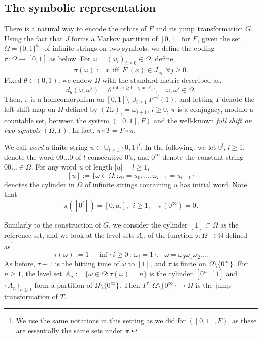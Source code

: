 \documentclass{amsart}
\theoremstyle{definition}
\theoremstyle{remark}
\theoremstyle{definition}
\numberwithin{equation}{section}
\newcommand{\N}{\mathbb N}
\begin{document}
\subsection{The symbolic representation} \label{sec:symb}
There is a natural way to encode the orbits of $F$ and its jump transformation $G$. Using the fact that $J$ forms a Markov partition of $[0,1]$ for $F$, given the set $\Omega = \{0,1\}^{\N_{0}}$ of infinite strings on two symbols, we define the coding $\pi : \Omega \to [0,1]$ as below. For $\omega = (\omega_{i})_{i \ge 0} \in \Omega$, define,
    \[
        \pi(\omega) := x \ \ \text{iff} \ \ F^{i}(x) \in J_{\omega_{i}} \ \ \forall j \ge 0.
    \]
Fixed $\theta \in (0,1)$, we endow $\Omega$ with the standard metric described as, 
    \[
        d_{\theta}(\omega,\omega') = \theta^{\inf \{ i \ge 0 : \omega_{i} \neq \omega'_{i} \}}, \quad  \omega, \omega' \in \Omega.
    \]
Then, $\pi$ is a homeomorphism on $[0,1] \setminus \cup_{i\ge 1} F^{-i}(1)$, and letting $T$ denote the left shift map on $\Omega$ defined by $(T\omega)_{i} = \omega_{i+1}$, $i\ge 0$, $\pi$ is a conjugacy, modulo a countable set, between the system $\left([0,1], F \right)$ and the well-known \emph{full shift on two symbols} $\left( \Omega , T \right)$. In fact, $\pi \circ T = F \circ \pi$. 

We call \emph{word} a finite string $u \in \cup_{l \ge 1} \{ 0,1\}^{l}$. In the following, we let $0^l$, $l\ge 1$, denote the word $00\dots 0$ of $l$ consecutive $0$'s, and $0^{\infty}$ denote the constant string $00\dots \in \Omega$. For any word $u$ of length $|u| = l \ge 1$,
\[
[u]:=\{ \omega \in \Omega : \omega_{0} = u_{0}, \dots, \omega_{l-1} = u_{l-1} \}
\]
denotes the cylinder in $\Omega$ of infinite strings containing $u$ has initial word. Note that 
\[
\pi([0^i]) = [0,a_i], \ \ i\ge 1, \quad \pi(0^\infty) = 0.
\]

Similarly to the construction of $G$, we consider the cylinder $[1]\subset \Omega$ as the reference set, and we look at the level sets $A_{n}$ of the function $\tau : \Omega \to \N$ defined as\footnote {We use the same notations in this setting as we did for $([0,1],F)$, as these are essentially the same sets under $\pi$.}
\[
         \tau(\omega) := 1 + \inf \{ i \ge 0 \, : \, \omega_{i} = 1 \} , \ \ \ \omega = \omega_{0} \omega_{1} \omega_{2} \dots .
\]
As before, $\tau - 1$ is the hitting time of $\omega$ to $[1]$, and $\tau$ is finite on $\Omega \setminus\{0^{\infty}\}$. For $n \ge 1$, the level set $A_{n} := \{ \omega \in \Omega : \tau(\omega) = n\}$  is the cylinder $[0^{n-1} 1]$ and $\{A_{n}\}_{n \ge 1}$ form a partition of $\Omega \setminus\{0^{\infty}\}$. Then $T^{\tau} : \Omega \setminus \{ 0^{\infty}\} \to \Omega$ is the jump transformation of $T$. 
\end{document}
